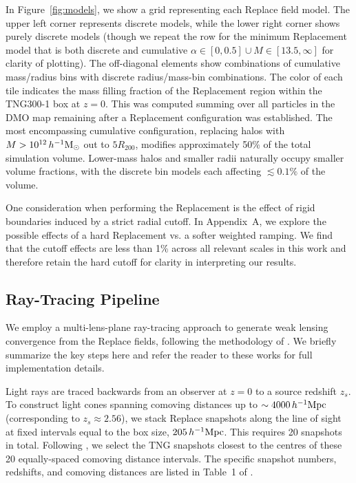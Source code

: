 \documentclass[linenumbers,trackchanges]{aastex701}
\begin{document}
In Figure~\ref{fig:models}, we show a grid representing each Replace field model. The upper left corner represents discrete models, while the lower right corner shows purely discrete models (though we repeat the row for the minimum Replacement model that is both discrete and cumulative $\alpha\in[0, 0.5] \cup M\in[13.5, \infty]$ for clarity of plotting). The off-diagonal elements show combinations of cumulative mass/radius bins with discrete radius/mass-bin combinations. The color of each tile indicates the mass filling fraction of the Replacement region within the TNG300-1 box at $z=0$. This was computed summing over all particles in the DMO map remaining after a Replacement configuration was established. The most encompassing cumulative configuration, replacing halos with $M>10^{12}\,h^{-1}{\rm M}_\odot$ out to $5R_{200}$, modifies approximately 50\% of the total simulation volume. Lower-mass halos and smaller radii naturally occupy smaller volume fractions, with the discrete bin models each affecting $\lesssim 0.1\%$ of the volume.

One consideration when performing the Replacement is the effect of rigid boundaries induced by a strict radial cutoff. In Appendix~A, we explore the possible effects of a hard Replacement vs. a softer weighted ramping. We find that the cutoff effects are less than 1\% across all relevant scales in this work and therefore retain the hard cutoff for clarity in interpreting our results.

\subsection{Ray-Tracing Pipeline}\label{sec:raytracing}

We employ a multi-lens-plane ray-tracing approach to generate weak lensing convergence from the Replace fields, following the methodology of \citet{jain2000, Hilbert09, Petri16a, Osato21, leeComparingWeakLensing2022, Ferlito24}. We briefly summarize the key steps here and refer the reader to these works for full implementation details.

Light rays are traced backwards from an observer at $z=0$ to a source redshift $z_s$. To construct light cones spanning comoving distances up to $\sim 4000\,h^{-1}{\rm Mpc}$ (corresponding to $z_s \approx 2.56$), we stack Replace snapshots along the line of sight at fixed intervals equal to the box size, $205\,h^{-1}{\rm Mpc}$. This requires 20 snapshots in total. Following \citet{Osato21}, we select the TNG snapshots closest to the centres of these 20 equally-spaced comoving distance intervals. The specific snapshot numbers, redshifts, and comoving distances are listed in Table~1 of \citet{Osato21}.
\end{document}
